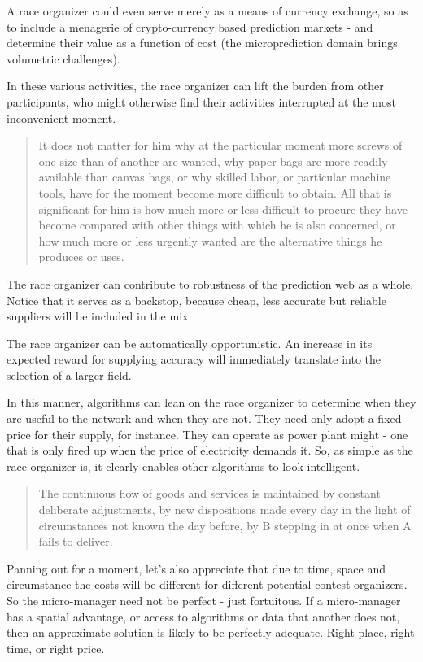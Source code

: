 A race organizer could even serve merely as a means of currency exchange, so as to include a menagerie of crypto-currency based prediction markets - and determine their value as a function of cost (the microprediction domain brings volumetric challenges). 

In these various activities, the race organizer can lift the burden from other participants, who might otherwise find their activities interrupted at the most inconvenient moment.

\begin{quote}{\cite{Hayek1945TheHayek}}
    It does not matter for him
why at the particular moment more screws of one size than of another are wanted,
why paper bags are more readily available than canvas bags, or
why skilled labor, or particular machine tools, have for the moment become more difficult to obtain. All that is significant for him is
how much more or less difficult to procure they have become compared with other things with which he is also concerned, or how much more or less urgently wanted are the alternative things he produces or uses.
\end{quote}

The race organizer can contribute to robustness of the prediction web as a whole. Notice that it serves as a backstop, because cheap, less accurate but reliable suppliers will be included in the mix. 

The race organizer can be automatically opportunistic. An increase in its expected reward for supplying accuracy will immediately translate into the selection of a larger field. 

In this manner, algorithms can lean on the race organizer to determine when they are useful to the network and when they are not. They need only adopt a fixed price for their supply, for instance. They can operate as power plant might - one that is only fired up when the price of electricity demands it. So, as simple as the race organizer is, it clearly enables other algorithms to look intelligent. 

\begin{quote}{ \cite{Hayek1945TheHayek} }
The continuous flow of goods and services is maintained by constant deliberate adjustments, by new dispositions made every day in the light of circumstances not known the day before, by
B stepping in at once when
A fails to deliver.
\end{quote}

Panning out for a moment, let's also appreciate that due to time, space and circumstance the costs will be different for different potential contest organizers. So the micro-manager need not be perfect - just fortuitous. If a micro-manager has a spatial advantage, or access to algorithms or data that another does not, then an approximate solution is likely to be perfectly adequate. Right place, right time, or right price. 


